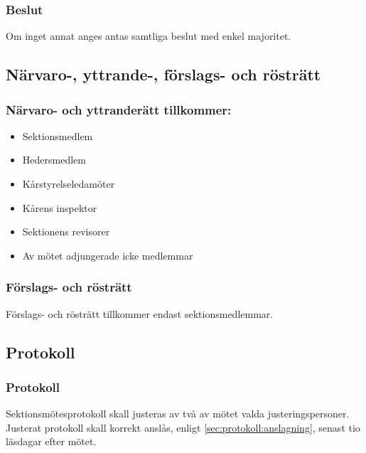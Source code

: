 \subsubsection{Beslut}
Om inget annat anges antas samtliga beslut med enkel majoritet.

\subsection{Närvaro-, yttrande-, förslags- och rösträtt}

\subsubsection{Närvaro- och yttranderätt tillkommer:}
\begin{itemize}
	\item Sektionsmedlem
	\item Hedersmedlem
	\item Kårstyrelseledamöter
	\item Kårens inspektor
	\item Sektionens revisorer
	\item Av mötet adjungerade icke medlemmar
\end{itemize}

\subsubsection{Förslags- och rösträtt}
Förslags- och rösträtt tillkommer endast sektionsmedlemmar.

\subsection{Protokoll}

\subsubsection{Protokoll}
Sektionsmötesprotokoll skall justeras av två av mötet valda justeringspersoner. Justerat protokoll skall korrekt anslås, enligt \ref{sec:protokoll:anslagning}, senast tio läsdagar efter mötet.